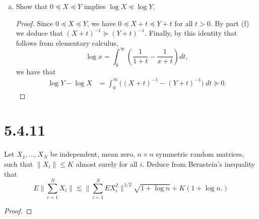 \documentclass[11pt,letterpaper]{report}
\begin{document}
\begin{enumerate}[(a)]
	\item Show that $0\preceq X\preceq Y$ implies $\log X \preceq \log Y$.
	\begin{proof}
		Since $0\preceq X\preceq Y$, we have $0\preceq X+t \preceq Y+t$ for all $t>0$. By part (f) we deduce that $(X+t)^{-1} \succeq (Y+t)^{-1}$. Finally, by this identity that follows from elementary calculus,
		\[
		\log x = \int_0^\infty \left(\frac{1}{1+t}-\frac{1}{x+t}\right)dt,
		\]
		we have that
		\begin{align*}
			\log Y - \log X &= \int_0^\infty \big((X+t)^{-1}-(Y+t)^{-1}\big)\ dt \succeq 0.
		\end{align*}
	\end{proof}
\end{enumerate}










\section*{5.4.11}
Let $X_1, \ldots, X_N$ be independent, mean zero, $n\times n$ symmetric random matrices, such that $\|X_i\|\leq K$ almost surely for all $i$. Deduce from Bernstein's inequality that
\[
E\bigg\|\sum_{i=1}^NX_i\bigg\| \lesssim \bigg\|\sum_{i=1}^NEX_i^2\bigg\|^{1/2}\sqrt{1+\log n} + K(1+\log n.)
\]
\begin{proof}
	
\end{proof}
\end{document}
